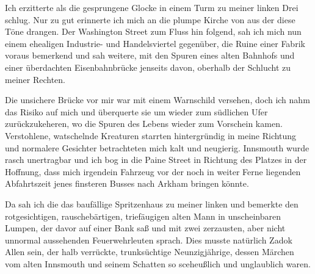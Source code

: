 Ich erzitterte als die gesprungene Glocke in einem Turm zu meiner linken Drei schlug. Nur zu gut erinnerte ich mich an die plumpe Kirche von aus der diese Töne drangen. Der Washington Street zum Fluss hin folgend, sah ich mich nun einem ehealigen Industrie- und Handelsviertel gegenüber, die Ruine einer Fabrik voraus bemerkend und sah weitere, mit den Spuren eines alten Bahnhofs und einer überdachten Eisenbahnbrücke jenseits davon, oberhalb der Schlucht zu meiner Rechten.

Die unsichere Brücke vor mir war mit einem Warnschild versehen, doch ich nahm das Risiko auf mich und überquerte sie um wieder zum südlichen Ufer zurückzukeheren, wo die Spuren des Lebens wieder zum Vorschein kamen. Verstohlene, watschelnde Kreaturen starrten hintergründig in meine Richtung und normalere Gesichter betrachteten mich kalt und neugierig. Innsmouth wurde rasch unertragbar und ich bog in die Paine Street in Richtung des Platzes in der Hoffnung, dass mich irgendein Fahrzeug vor der noch in weiter Ferne liegenden Abfahrtszeit jenes finsteren Busses nach Arkham bringen könnte.

Da sah ich die das baufällige Spritzenhaus zu meiner linken und bemerkte den rotgesichtigen, rauschebärtigen, triefäugigen alten Mann in unscheinbaren Lumpen, der davor auf einer Bank saß und mit zwei zerzausten, aber nicht unnormal aussehenden Feuerwehrleuten sprach. Dies musste natürlich Zadok Allen sein, der halb verrückte, trunksüchtige Neunzigjährige, dessen Märchen vom alten Innsmouth und seinem Schatten so sceheußlich und unglaublich waren.

